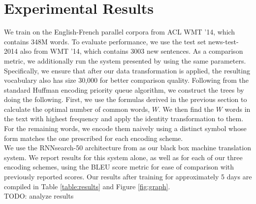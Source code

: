 \section{Experimental Results}
\label{sec:exp}

We train on the English-French parallel corpora from ACL WMT '14, which contains
348M words. To evaluate performance, we use the test set news-test-2014 also from
WMT '14, which contains 3003 new sentences. As a comparison metric, we additionally run the system presented by
 using the same parameters. Specifically, we ensure
that after our data transformation is applied, the resulting vocabulary also has size
30,000 for better comparison quality. Following from the standard Huffman encoding
priority queue algorithm, we construct the trees by doing the following. First, we use
the formulas derived in the previous section to calculate the optimal number of
common words, $W$. We then find the $W$ words in the text with highest frequency and
apply the identity transformation to them. For the remaining words, we encode them
naively using a distinct symbol whose form matches the one prescribed for each
encoding scheme.\\

We use the RNNsearch-50 architecture from  as
our black box machine translation system. We report results for this system alone,
as well as for each of our three encoding schemes, using the BLEU score metric for
ease of comparison with previously reported scores. Our results after training
for approximately 5 days are compiled in Table \ref{table:results} and Figure \ref{fig:graph}.\\

TODO: analyze results

\begin{table}
  \centering
  \vspace{8pt}
  \caption{BLEU scores on detokenized test set for various encoding
    schemes after training for 5 days.}
  \label{table:results}
\end{table}


